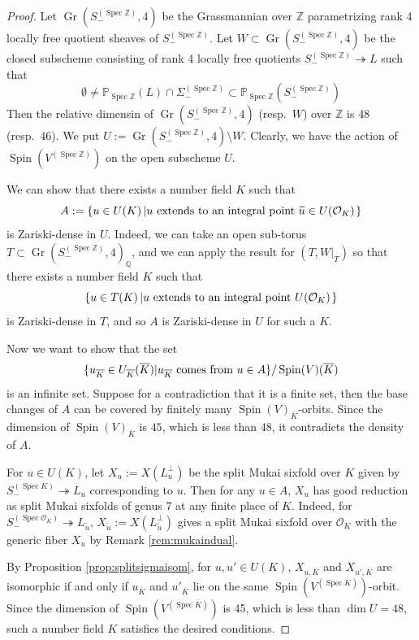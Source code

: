 \documentclass[autodetect-engine, a4paper]{amsart}
\theoremstyle{definition}
\def\P{{\mathbb P}}
\def\Q{{\mathbb Q}}
\def\Z{{\mathbb Z}}
\def\cO{\mathcal{O}}
\DeclareMathOperator{\Spin}{\mathrm{Spin}}
\DeclareMathOperator\Spec{\mathrm{Spec}}
\DeclareMathOperator\Gr{\mathrm{Gr}}
\begin{document}
\begin{proof}
Let $\Gr(S_{-}^{(\Spec \Z)}, 4)$ be the Grassmannian over $\Z$ parametrizing rank 4 locally free quotient sheaves of $S_{-}^{(\Spec \Z)}$.
Let $W \subset \Gr (S_{-}^{(\Spec \Z)},4)$ be the closed subscheme consisting of rank 4 locally free quotients $S_{-}^{(\Spec \Z)} \twoheadrightarrow L$
such that 
\[
\emptyset \neq \P_{\Spec \Z}(L) \cap \Sigma_{-}^{(\Spec \Z)}  \subset \P_{\Spec \Z} (S_{-}^{(\Spec \Z)})
\]
Then the relative dimensin of $\Gr (S_{-}^{(\Spec \Z)},4)$ (resp.\ $W$) over $\Z$ is 48 (resp.\ 46).
We put $U:= \Gr (S_{-}^{(\Spec \Z)},4) \setminus W$.
Clearly, we have the action of $\Spin(V^{(\Spec \Z)})$ on the open subscheme $U$.


We can show that there exists a number field $K$ such that 
\[
A :=
\left\{ 
u \in U(K) \left| u \textup{ extends to an integral point }\widetilde{u} \in  U( \cO_{K})
\right.
\right\}
\]
is Zariski-dense in $U$. 
Indeed, we can take an open sub-torus $T \subset \Gr (S^{(\Spec \Z)}_{-},4)_{\Q}$, and we can apply the result \cite[Proposition 5.1]{Hassett-Tschinkel} for $(T, W|_{T})$ so that there exists a number field $K$ such that
\[
\left\{ 
u \in T(K) \left| u \textup{ extends to an integral point } U( \cO_{K})
\right.
\right\}
\]
is Zariski-dense in $T$, and so $A$ is Zariski-dense in $U$ for such a $K$.

Now we want to show that the set
\[
\{ u_{\overline{K}} \in U_{\overline{K}} (\overline{K})| u_{\overline{K}} \textup{ comes from } u \in A 
\} / \Spin(V)(\overline{K})
\]
is an infinite set.
Suppose for a contradiction that it is a finite set, then the base changes of $A$ can be covered by finitely many $\Spin(V)_{\overline{K}}$-orbits. Since the dimension of $\Spin(V)_{\overline{K}}$ is $45$, which is less than $48$, it contradicts the density of $A$.

For $u \in U(K)$, let $X_{u} := X(L_u^{\perp})$ be the split Mukai sixfold over $K$ given by $S_{-}^{(\Spec K)} \twoheadrightarrow L_u$ corresponding to $u$.
Then for any $u \in A$, $X_{u}$ has good reduction as split Mukai sixfolds of genus 7 at any finite place of $K$.
Indeed, for $S_{-}^{(\Spec \cO_{K})} \twoheadrightarrow L_{\widetilde{u}}$, $X_{\widetilde{u}} := X(L_{\widetilde{u}}^{\perp})$ gives a split Mukai sixfold over $\cO_{K}$ with the generic fiber $X_{u}$ by Remark \ref{rem:mukaindual}.

By Proposition \ref{prop:splitsigmaisom}, for $u, u' \in U(K)$, $X_{u, \overline{K}}$ and $X_{u',\overline{K}}$ are isomorphic if and only if $u_{\overline{K}}$ and $u'_{\overline{K}}$ lie on the same $\Spin (V^{(\Spec \overline{K})})$-orbit.
Since the dimension of $\Spin (V^{(\Spec \overline{K})})$ is 45, which is less than $\dim U =48$, such a number field $K$ satisfies the desired conditions.
\end{proof}
\end{document}
